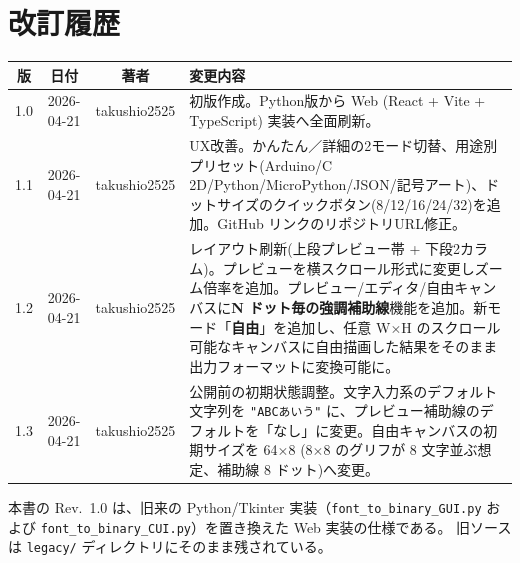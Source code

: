 \section*{改訂履歴}

\begin{tabularx}{\textwidth}{c c c X}
\toprule
\textbf{版} & \textbf{日付} & \textbf{著者} & \textbf{変更内容} \\
\midrule
1.0 & 2026-04-21 & takushio2525 & 初版作成。Python版から Web (React + Vite + TypeScript) 実装へ全面刷新。\\
1.1 & 2026-04-21 & takushio2525 & UX改善。かんたん／詳細の2モード切替、用途別プリセット(Arduino/C 2D/Python/MicroPython/JSON/記号アート)、ドットサイズのクイックボタン(8/12/16/24/32)を追加。GitHub リンクのリポジトリURL修正。\\
1.2 & 2026-04-21 & takushio2525 & レイアウト刷新(上段プレビュー帯 + 下段2カラム)。プレビューを横スクロール形式に変更しズーム倍率を追加。プレビュー/エディタ/自由キャンバスに\textbf{N ドット毎の強調補助線}機能を追加。新モード「\textbf{自由}」を追加し、任意 W$\times$H のスクロール可能なキャンバスに自由描画した結果をそのまま出力フォーマットに変換可能に。\\
1.3 & 2026-04-21 & takushio2525 & 公開前の初期状態調整。文字入力系のデフォルト文字列を \texttt{"ABCあいう"} に、プレビュー補助線のデフォルトを「なし」に変更。自由キャンバスの初期サイズを 64$\times$8 (8$\times$8 のグリフが 8 文字並ぶ想定、補助線 8 ドット)へ変更。\\
\bottomrule
\end{tabularx}

\vspace{4mm}

\begin{notebox}[旧版との関係]
本書の Rev.~1.0 は、旧来の Python/Tkinter 実装（\texttt{font\_to\_binary\_GUI.py} および
\texttt{font\_to\_binary\_CUI.py}）を置き換えた Web 実装の仕様である。
旧ソースは \texttt{legacy/} ディレクトリにそのまま残されている。
\end{notebox}

\newpage
